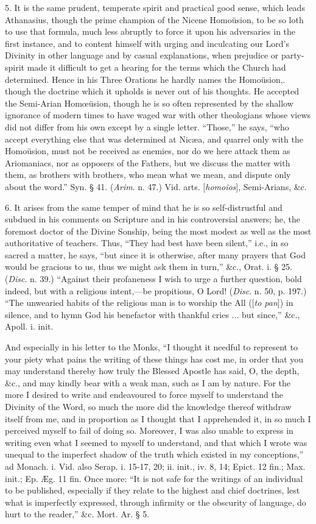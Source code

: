 5. It is the same prudent, temperate spirit and
practical good sense, which leads Athanasius, though the prime
champion of the Nicene Homoüsion, to be so loth to use that formula,
much less abruptly to force it upon his adversaries in the first
instance, and to content himself with urging and inculcating our Lord's
Divinity in other language and by casual explanations, when prejudice
or party-spirit made it difficult to get a hearing for the terms which
the Church had determined. Hence in his Three Orations he hardly names
the Homoüsion,. though the doctrine which it upholds is never out of
his thoughts. He accepted the Semi-Arian Homœüsion, though he is so
often represented by the shallow ignorance of modern times to have
waged war with other theologians whose views did not differ from his
own except by a single letter. ``Those,'' he says, ``who accept
everything else that was determined at Nicæa, and quarrel only with
the Homoüsion, must not be received as enemies, nor do we here attack
them as Ariomaniacs, nor as opposers of the Fathers, but we discuss
the matter with them, as brothers with brothers, who mean what we
mean, and dispute only about the word.'' Syn. § 41. (\emph{Arim}. n.
47.) Vid. arts. [\emph{homoios}], Semi-Arians, \&c.

6. It arises from the same temper of mind that he
is so self-distrustful and subdued in his comments on Scripture and in
his controversial answers; he, the foremost doctor of the Divine
Sonship, being the most modest as well as the most authoritative
of teachers. Thus, ``They had best have been silent,'' i.e., in so
sacred a matter, he says, ``but since it is otherwise, after many
prayers that God would be gracious to us, thus we might ask them in
turn,'' \&c., Orat. i. § 25. (\emph{Disc}. n. 39.) ``Against their
profaneness I wish to urge a further question, bold indeed, but with a
religious intent,—be propitious, O Lord! (\emph{Disc}. n. 50, p.
197.) ``The unwearied habits of the religious man is to worship the All
([\emph{to pan}]) in silence, and to hymn God his benefactor with
thankful cries ... but since,'' \&c., Apoll. i. init.

And especially in his letter to the Monks, ``I
thought it needful to represent to your piety what pains the writing
of these things has cost me, in order that you may understand thereby
how truly the Blessed Apostle has said, O, the depth, \&c., and may
kindly bear with a weak man, such as I am by nature. For the more I
desired to write and endeavoured to force myself to understand the
Divinity of the Word, so much the more did the knowledge thereof
withdraw itself from me, and in proportion as I thought that I
apprehended it, in so much I perceived myself to fail of doing so.
Moreover, I was also unable to express in writing even what I seemed
to myself to understand, and that which I wrote was unequal to the
imperfect shadow of the truth which existed in my conceptions,'' ad
Monach. i. Vid. also Serap. i. 15-17, 20; ii. init., iv. 8, 14; Epict.
12 fin.; Max. init.; Ep. Æg. 11 fin. Once more: ``It is not safe for
the writings of an individual to be published, especially if they
relate to the highest and chief doctrines, lest what is
imperfectly expressed, through infirmity or the obscurity of language,
do hurt to the reader,'' \&c. Mort. Ar. § 5.

